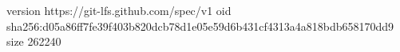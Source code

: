 version https://git-lfs.github.com/spec/v1
oid sha256:d05a86ff7fe39f403b820dcb78d1e05e59d6b431cf4313a4a818bdb658170dd9
size 262240
